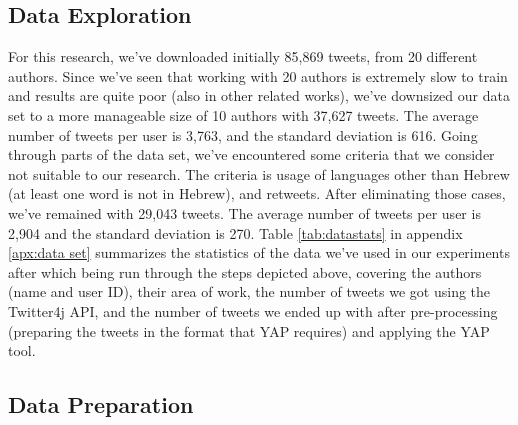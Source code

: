 \documentclass[a4paper]{article}
\begin{document}
\subsection{Data Exploration}

For this research, we've downloaded initially 85,869 tweets, from 20 different authors. Since we've seen that working with 20 authors is extremely slow to train and results are quite poor (also in other related works), we've downsized our data set to a more manageable size of 10 authors with 37,627 tweets.
The average number of tweets per user is 3,763, and the standard deviation is 616.
Going through parts of the data set, we've encountered some criteria that we consider not suitable to our research. The criteria is usage of languages other than Hebrew (at least one word is not in Hebrew), and retweets.
After eliminating those cases, we've remained with 29,043 tweets. The average number of tweets per user is 2,904 and the standard deviation is 270.
Table \ref{tab:datastats} in appendix \ref{apx:data set} summarizes the statistics of the data we've used in our experiments after which being run through the steps depicted above, covering the authors (name and user ID), their area of work, the number of tweets we got using the Twitter4j API, and the number of tweets we ended up with after pre-processing (preparing the tweets in the format that YAP requires) and applying the YAP tool.\\

\subsection{Data Preparation}
\end{document}
